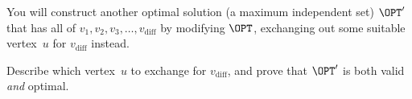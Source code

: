 \documentclass[11pt,addpoints]{exam}
\begin{document}
\begin{questions}
\begin{parts}
    You will construct another optimal solution (a maximum independent set) $\OPT'$ that has all of $v_1,v_2,v_3,\ldots,v_{\text{diff}}$ by modifying $\OPT$, exchanging out some suitable vertex~$u$ for $v_{\text{diff}}$ instead.

    Describe which vertex~$u$ to exchange for $v_\text{diff}$, and prove that $\OPT'$ is both valid \textit{and} optimal.

    \begin{solution}
    \end{solution}

  \end{parts}




\end{questions}
\end{document}
